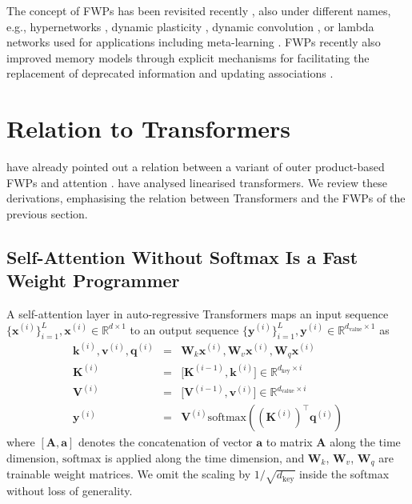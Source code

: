 \documentclass{article}
\def\va{{\bm{a}}}
\def\vk{{\bm{k}}}
\def\vq{{\bm{q}}}
\def\vv{{\bm{v}}}
\def\vx{{\bm{x}}}
\def\vy{{\bm{y}}}
\def\mA{{\bm{A}}}
\def\mK{{\bm{K}}}
\def\mV{{\bm{V}}}
\def\mW{{\bm{W}}}
\newcommand{\softmax}{\mathrm{softmax}}
\theoremstyle{definition}
\begin{document}
The concept of FWPs has been
revisited recently  \citep{ba2016using, schlag2017gated},
also under different names, e.g.,
 hypernetworks \citep{ha2017hypernetworks, perez2018film, galanti2020hyper},
dynamic plasticity \citep{pmlr-v80-miconi18a, miconi2018backpropamine}, dynamic convolution
\citep{KleinWA15, noh2016image, NIPS2016_8bf1211f}, or lambda networks \citep{bello2021lambdanetworks}
used for applications including meta-learning \citep{munkhdalai2017meta, munkhdalai2018metalearning, MunkhdalaiSWT19, kirsch2020meta}.
FWPs recently also improved memory models
through explicit
mechanisms for facilitating the replacement of deprecated information 
and updating associations \citep{schlag2018learning, schlag2020fastweightmemory}.

\section{Relation to Transformers}
\label{sec:relation_to_transformers}
 \citet{ba2016using} 
have already pointed out a relation between a variant of outer product-based FWPs \citep{schmidhuber1993reducing} and attention \citep{bahdanau2014neural}. \citet{katharopoulos2020transformers} have analysed linearised transformers.
We review these derivations, emphasising the relation between Transformers and the FWPs of the previous section.

\subsection{Self-Attention Without Softmax Is a Fast Weight Programmer}
\label{sec:no_softmax}
A self-attention layer in auto-regressive Transformers \cite{trafo}
maps an input sequence $\{ \vx^{(i)} \}_{i=1}^L, \vx^{(i)} \in \mathbb{R}^{d \times1}$
to an output sequence $\{ \vy^{(i)} \}_{i=1}^L, \vy^{(i)} \in \mathbb{R}^{d_\text{value}\times1}$ as
\begin{eqnarray}
\vk^{(i)}, \vv^{(i)}, \vq^{(i)} &=& \mW_k \vx^{(i)}, \mW_v \vx^{(i)}, \mW_q \vx^{(i)} \label{eq:proj} \\
\mK^{(i)} &=& \big[\mK^{(i-1)}, \vk^{(i)}] \in \mathbb{R}^{d_\text{key} \times i} \\
\mV^{(i)}  &=& \big[\mV^{(i-1)} , \vv^{(i)} ] \in \mathbb{R}^{d_\text{value} \times i} \\
\vy^{(i)} &=& \mV^{(i)} \softmax((\mK^{(i)})^{\top} \vq^{(i)}) \label{eq:trafo_softmax}
\end{eqnarray}
where $[\mA, \va]$ denotes the concatenation of vector $\va$ to matrix $\mA$ along the time dimension,
$\softmax$ is applied along the time dimension,
and $\mW_k$, $\mW_v$, $\mW_q$ are trainable weight matrices.
We omit the scaling by $1/\sqrt{d_\text{key}}$ inside the softmax without loss of generality.
\end{document}
